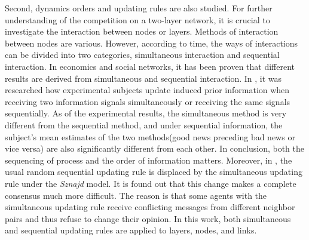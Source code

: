Second, dynamics orders and updating rules are also studied. For further understanding of the competition on a two-layer network, it is crucial to investigate the interaction between nodes or layers. Methods of interaction between nodes are various. However, according to time, the ways of interactions can be divided into two categories, simultaneous interaction and sequential interaction\parencite{sirbu2017}. In economics and social networks, it has been proven that different results are derived from simultaneous and sequential interaction\parencite{hoffman2011, dietrich2004}. In \parencite{hoffman2011}, it was researched how experimental subjects update induced prior information when receiving two information signals simultaneously or receiving the same signals sequentially. As of the experimental results, the simultaneous method is very different from the sequential method, and under sequential information, the subject’s mean estimates of the two methods(good news preceding bad news or vice versa) are also significantly different from each other. In conclusion, both the sequencing of process and the order of information matters. Moreover, in \parencite{dietrich2004}, the usual random sequential updating rule is displaced by the simultaneous updating rule under the \textit{Sznajd} model. It is found out that this change makes a complete consensus much more difficult. The reason is that some agents with the simultaneous updating rule receive conflicting messages from different neighbor pairs and thus refuse to change their opinion. In this work, both simultaneous and sequential updating rules are applied to layers, nodes, and links.

